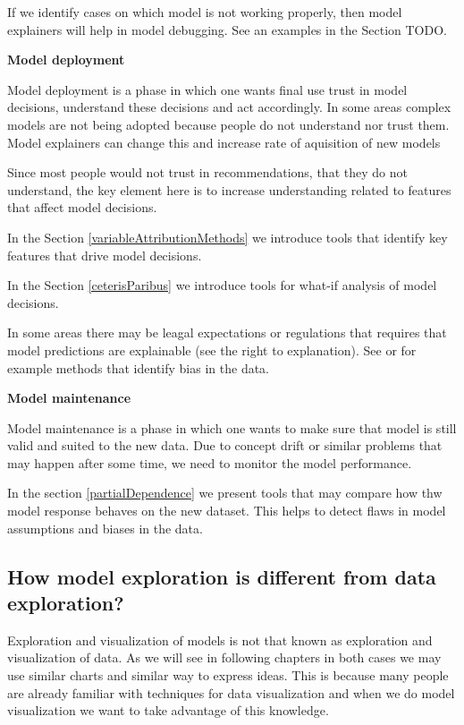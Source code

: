\documentclass[]{krantz}
\theoremstyle{definition}
\theoremstyle{definition}
\theoremstyle{definition}
\theoremstyle{remark}
\begin{document}
If we identify cases on which model is not working properly, then model
explainers will help in model debugging. See an examples in the Section
TODO.

\textbf{Model deployment}

Model deployment is a phase in which one wants final use trust in model
decisions, understand these decisions and act accordingly. In some areas
complex models are not being adopted because people do not understand
nor trust them. Model explainers can change this and increase rate of
aquisition of new models

Since most people would not trust in recommendations, that they do not
understand, the key element here is to increase understanding related to
features that affect model decisions.

In the Section \ref{variableAttributionMethods} we introduce tools that
identify key features that drive model decisions.

In the Section \ref{ceterisParibus} we introduce tools for what-if
analysis of model decisions.

In some areas there may be leagal expectations or regulations that
requires that model predictions are explainable (see the right to
explanation). See \citep{2017arXiv171107076L} or
\citep{2017arXiv171006169T} for example methods that identify bias in
the data.

\textbf{Model maintenance}

Model maintenance is a phase in which one wants to make sure that model
is still valid and suited to the new data. Due to concept drift or
similar problems that may happen after some time, we need to monitor the
model performance.

In the section \ref{partialDependence} we present tools that may compare
how thw model response behaves on the new dataset. This helps to detect
flaws in model assumptions and biases in the data.

\hypertarget{how-model-exploration-is-different-from-data-exploration}{%
\subsection{How model exploration is different from data
exploration?}\label{how-model-exploration-is-different-from-data-exploration}}

Exploration and visualization of models is not that known as exploration
and visualization of data. As we will see in following chapters in both
cases we may use similar charts and similar way to express ideas. This
is because many people are already familiar with techniques for data
visualization and when we do model visualization we want to take
advantage of this knowledge.
\end{document}
